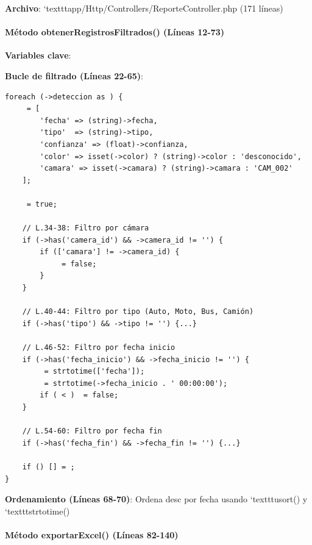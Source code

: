 \textbf{Archivo}: `texttt{app/Http/Controllers/ReporteController.php} (171 líneas)

\paragraph{Método obtenerRegistrosFiltrados() (Líneas 12-73)}

\textbf{Variables clave}:

\textbf{Bucle de filtrado (Líneas 22-65)}:
\begin{lstlisting}[style=phpstyle]
foreach (->deteccion as ) {
     = [
        'fecha' => (string)->fecha,
        'tipo'  => (string)->tipo,
        'confianza' => (float)->confianza,
        'color' => isset(->color) ? (string)->color : 'desconocido',
        'camara' => isset(->camara) ? (string)->camara : 'CAM_002'
    ];
    
     = true;
    
    // L.34-38: Filtro por cámara
    if (->has('camera_id') && ->camera_id != '') {
        if (['camara'] != ->camera_id) {
             = false;
        }
    }
    
    // L.40-44: Filtro por tipo (Auto, Moto, Bus, Camión)
    if (->has('tipo') && ->tipo != '') {...}
    
    // L.46-52: Filtro por fecha inicio
    if (->has('fecha_inicio') && ->fecha_inicio != '') {
         = strtotime(['fecha']);
         = strtotime(->fecha_inicio . ' 00:00:00');
        if ( < )  = false;
    }
    
    // L.54-60: Filtro por fecha fin
    if (->has('fecha_fin') && ->fecha_fin != '') {...}
    
    if () [] = ;
}
\end{lstlisting}

\textbf{Ordenamiento (Líneas 68-70)}: Ordena desc por fecha usando `texttt{usort()} y `texttt{strtotime()}

\paragraph{Método exportarExcel() (Líneas 82-140)}

